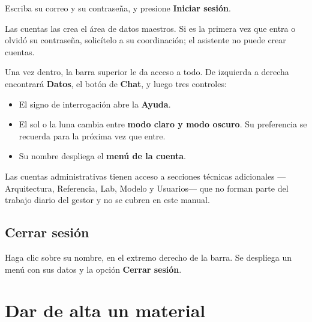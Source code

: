 
Escriba su correo y su contraseña, y presione \textbf{Iniciar sesión}.

\begin{nota}
Las cuentas las crea el área de datos maestros. Si es la primera vez que entra
o olvidó su contraseña, solicítelo a su coordinación; el asistente no puede
crear cuentas.
\end{nota}

Una vez dentro, la barra superior le da acceso a todo. De izquierda a derecha
encontrará \textbf{Datos}, el botón de \textbf{Chat}, y luego tres controles:

\begin{itemize}[leftmargin=*, itemsep=3pt]
  \item El signo de interrogación abre la \textbf{Ayuda}.
  \item El sol o la luna cambia entre \textbf{modo claro y modo oscuro}. Su
        preferencia se recuerda para la próxima vez que entre.
  \item Su nombre despliega el \textbf{menú de la cuenta}.
\end{itemize}


\begin{nota}
Las cuentas administrativas tienen acceso a secciones técnicas adicionales
—Arquitectura, Referencia, Lab, Modelo y Usuarios— que no forman parte del
trabajo diario del gestor y no se cubren en este manual.
\end{nota}

\subsection{Cerrar sesión}

Haga clic sobre su nombre, en el extremo derecho de la barra. Se despliega un
menú con sus datos y la opción \textbf{Cerrar sesión}.


\newpage
\section{Dar de alta un material}

